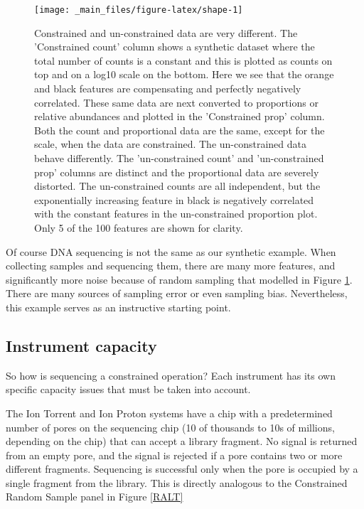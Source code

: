 \documentclass[onecolumn]{book}
\theoremstyle{definition}
\theoremstyle{definition}
\theoremstyle{definition}
\theoremstyle{remark}
\begin{document}
\begin{figure}

{\centering \texttt{[image: \_main\_files/figure-latex/shape-1]} 

}

\caption{Constrained and un-constrained data are very different. The 'Constrained count' column shows a synthetic dataset where the total number of counts is a constant and this is plotted as counts on top and on a log10 scale on the bottom. Here we see that the orange and black features are compensating and perfectly negatively correlated. These same data are next converted to proportions or relative abundances and plotted in the 'Constrained prop' column. Both the count and proportional data are the same, except for the scale, when the data are constrained. The un-constrained data behave differently. The 'un-constrained count' and 'un-constrained prop' columns are distinct and the proportional data are severely distorted. The un-constrained counts are all independent, but the  exponentially increasing feature in black is negatively correlated with the constant features in the un-constrained proportion plot. Only 5 of the 100 features are shown for clarity.}\label{fig:shape}
\end{figure}

Of course DNA sequencing is not the same as our synthetic example. When
collecting samples and sequencing them, there are many more features,
and significantly more noise because of random sampling that modelled in
Figure \ref{fig:shape}. There are many sources of sampling error or even
sampling bias. Nevertheless, this example serves as an instructive
starting point.

\hypertarget{instrument-capacity}{%
\subsection{Instrument capacity}\label{instrument-capacity}}

So how is sequencing a constrained operation? Each instrument has its
own specific capacity issues that must be taken into account.

The Ion Torrent and Ion Proton systems have a chip with a predetermined
number of pores on the sequencing chip (10 of thousands to 10s of
millions, depending on the chip) that can accept a library fragment. No
signal is returned from an empty pore, and the signal is rejected if a
pore contains two or more different fragments. Sequencing is successful
only when the pore is occupied by a single fragment from the library.
This is directly analogous to the Constrained Random Sample panel in
Figure \ref{RALT}
\end{document}
